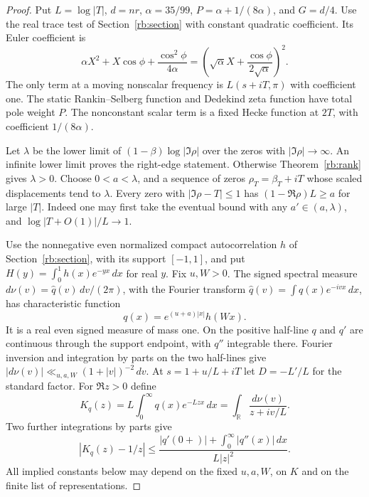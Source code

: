 \documentclass[11pt]{article}
\begin{document}
\begin{proof}
Put $L=\log|T|$, $d=nr$, $\alpha=35/99$, $P=\alpha+1/(8\alpha)$, and $G=d/4$. Use the real trace test of Section~\ref{rb:section} with constant quadratic coefficient. Its Euler coefficient is
\[
 \alpha X^2+X\cos\phi+\frac{\cos^2\phi}{4\alpha}
 =\left(\sqrt{\alpha}X+\frac{\cos\phi}{2\sqrt{\alpha}}\right)^2 .
\]
The only term at a moving nonscalar frequency is $L(s+iT,\pi)$ with coefficient one. The static Rankin--Selberg function and Dedekind zeta function have total pole weight $P$. The nonconstant scalar term is a fixed Hecke function at $2T$, with coefficient $1/(8\alpha)$.

Let $\lambda$ be the lower limit of $(1-\beta)\log|\Im\rho|$ over the zeros with $|\Im\rho|\to\infty$. An infinite lower limit proves the right-edge statement. Otherwise Theorem~\ref{rb:rank} gives $\lambda>0$. Choose $0<a<\lambda$, and a sequence of zeros $\rho_T=\beta_T+iT$ whose scaled displacements tend to $\lambda$. Every zero with $|\Im\rho-T|\le1$ has $(1-\Re\rho)L\ge a$ for large $|T|$. Indeed one may first take the eventual bound with any $a'\in(a,\lambda)$, and $\log|T+O(1)|/L\to1$.

Use the nonnegative even normalized compact autocorrelation $h$ of Section~\ref{rb:section}, with its support $[-1,1]$, and put $H(y)=\int_0^1 h(x)e^{-yx}\,dx$ for real $y$. Fix $u,W>0$. The signed spectral measure $d\nu(v)=\widehat q(v)\,dv/(2\pi)$, with the Fourier transform $\widehat q(v)=\int q(x)e^{-ivx}\,dx$, has characteristic function
\[
                 q(x)=e^{(u+a)|x|} h(Wx).
\]
It is a real even signed measure of mass one. On the positive half-line $q$ and $q'$ are continuous through the support endpoint, with $q''$ integrable there. Fourier inversion and integration by parts on the two half-lines give $|d\nu(v)|\ll_{u,a,W}(1+|v|)^{-2}\,dv$. At $s=1+u/L+iT$ let $D=-L'/L$ for the standard factor. For $\Re z>0$ define
\[
 K_q(z)=L\int_0^\infty q(x)e^{-Lzx}\,dx
       =\int_{\mathbb R}\frac{d\nu(v)}{z+iv/L}.
\]
Two further integrations by parts give
\[
 |K_q(z)-1/z|\le
 \frac{|q'(0+)|+\int_0^\infty|q''(x)|\,dx}{L|z|^2}.
\]
All implied constants below may depend on the fixed $u,a,W$, on $K$ and on the finite list of representations.


\end{proof}
\end{document}
